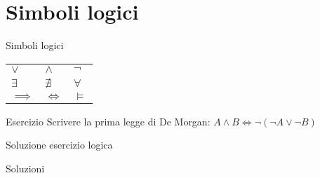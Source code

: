 \section{Simboli logici}
  \begin{frame}{Simboli logici}


	\begin{table}[h!]
	\begin{tabular}{p{2.6cm} p{2.6cm} p{2.6cm}}
	\hline
	$\lor$ \texttt{\lor} & $\land$ \texttt{\land} & $\neg$ \texttt{\neg} \\[0.4cm]
	$\exists$ \texttt{\exists} & $\nexists$ \texttt{\nexists} & $\forall$ \texttt{\forall} \\[0.4cm]
	$\implies$ \texttt{\implies} & $\iff$ \texttt{\iff} & $\models$ \texttt{\models} \\
	\hline
	\end{tabular}
	\end{table}


	
	\begin{esercizio}{Esercizio}
	Scrivere la prima legge di De Morgan: $A \land B \iff \neg (\neg A \lor \neg B)$
    \end{esercizio}

\end{frame}

\begin{frame}{Soluzione esercizio logica}

    \begin{soluzione}{Soluzioni}
    \end{soluzione}

\end{frame}
